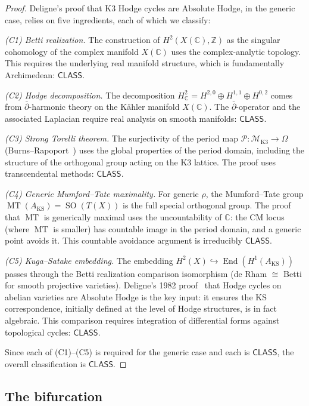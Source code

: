 \documentclass[11pt,a4paper]{article}
\theoremstyle{plain}
\theoremstyle{definition}
\newcommand{\CLASS}{\textsf{CLASS}}
\newcommand{\Z}{\mathbb{Z}}
\newcommand{\C}{\mathbb{C}}
\DeclareMathOperator{\End}{End}
\DeclareMathOperator{\MT}{MT}
\DeclareMathOperator{\SO}{SO}
\begin{document}
\begin{proof}
Deligne's proof that K3 Hodge cycles are Absolute Hodge, in the generic case, relies on five ingredients, each of which we classify:

\emph{(C1) Betti realization.} The construction of $H^2(X(\C), \Z)$ as the singular cohomology of the complex manifold $X(\C)$ uses the complex-analytic topology. This requires the underlying real manifold structure, which is fundamentally Archimedean: $\CLASS$.

\emph{(C2) Hodge decomposition.} The decomposition $H^2_\C = H^{2,0} \oplus H^{1,1} \oplus H^{0,2}$ comes from $\bar{\partial}$-harmonic theory on the K\"ahler manifold $X(\C)$. The $\bar{\partial}$-operator and the associated Laplacian require real analysis on smooth manifolds: $\CLASS$.

\emph{(C3) Strong Torelli theorem.} The surjectivity of the period map $\mathcal{P} : \mathcal{M}_{\mathrm{K3}} \to \Omega$ (Burns--Rapoport~\cite{burns-rapoport}) uses the global properties of the period domain, including the structure of the orthogonal group acting on the K3 lattice. The proof uses transcendental methods: $\CLASS$.

\emph{(C4) Generic Mumford--Tate maximality.} For generic $\rho$, the Mumford--Tate group $\MT(A_{\mathrm{KS}}) = \SO(T(X))$ is the full special orthogonal group. The proof that $\MT$ is generically maximal uses the uncountability of $\C$: the CM locus (where $\MT$ is smaller) has countable image in the period domain, and a generic point avoids it. This countable avoidance argument is irreducibly $\CLASS$.

\emph{(C5) Kuga--Satake embedding.} The embedding $H^2(X) \hookrightarrow \End(H^1(A_{\mathrm{KS}}))$ passes through the Betti realization comparison isomorphism (de Rham $\cong$ Betti for smooth projective varieties). Deligne's 1982 proof~\cite{deligne-absolute} that Hodge cycles on abelian varieties are Absolute Hodge is the key input: it ensures the KS correspondence, initially defined at the level of Hodge structures, is in fact algebraic. This comparison requires integration of differential forms against topological cycles: $\CLASS$.

Since each of (C1)--(C5) is required for the generic case and each is $\CLASS$, the overall classification is $\CLASS$.
\end{proof}

\subsection{The bifurcation}
\end{document}
